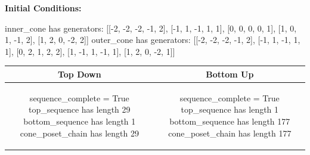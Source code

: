 \documentclass[10pt]{article}
\begin{document}
\textbf{Initial Conditions:}
\begin{SAGE}
inner_cone has generators: 
[[-2, -2, -2, -1, 2], [-1, 1, -1, 1, 1], [0, 0, 0, 0, 1], [1, 0, 1, -1, 2], [1, 2, 0, -2, 2]]
outer_cone has generators: 
[[-2, -2, -2, -1, 2], [-1, 1, -1, 1, 1], [0, 2, 1, 2, 2], [1, -1, 1, -1, 1], [1, 2, 0, -2, 1]]

\end{SAGE}
\begin{tabular}{c|c}
\textbf{Top Down} & \textbf{Bottom Up} \\ \hline  
\begin{SAGE}
sequence_complete = True
top_sequence has length 29
bottom_sequence has length 1
cone_poset_chain has length 29
\end{SAGE} 
&
\begin{SAGE}
sequence_complete = True
top_sequence has length 1
bottom_sequence has length 177
cone_poset_chain has length 177
\end{SAGE} 
\\ \hline


\end{tabular}
\end{document}
